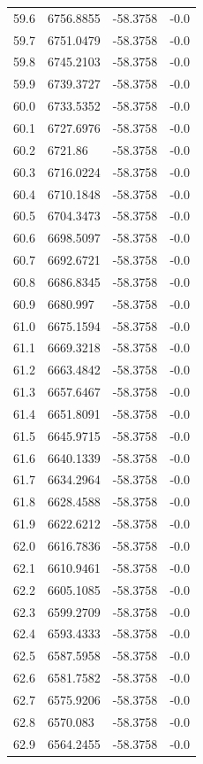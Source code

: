 \begin{table}[H]
\begin{tabular}{llll}
59.6 & 6756.8855 & -58.3758 & -0.0 \\
59.7 & 6751.0479 & -58.3758 & -0.0 \\
59.8 & 6745.2103 & -58.3758 & -0.0 \\
59.9 & 6739.3727 & -58.3758 & -0.0 \\
60.0 & 6733.5352 & -58.3758 & -0.0 \\
60.1 & 6727.6976 & -58.3758 & -0.0 \\
60.2 & 6721.86 & -58.3758 & -0.0 \\
60.3 & 6716.0224 & -58.3758 & -0.0 \\
60.4 & 6710.1848 & -58.3758 & -0.0 \\
60.5 & 6704.3473 & -58.3758 & -0.0 \\
60.6 & 6698.5097 & -58.3758 & -0.0 \\
60.7 & 6692.6721 & -58.3758 & -0.0 \\
60.8 & 6686.8345 & -58.3758 & -0.0 \\
60.9 & 6680.997 & -58.3758 & -0.0 \\
61.0 & 6675.1594 & -58.3758 & -0.0 \\
61.1 & 6669.3218 & -58.3758 & -0.0 \\
61.2 & 6663.4842 & -58.3758 & -0.0 \\
61.3 & 6657.6467 & -58.3758 & -0.0 \\
61.4 & 6651.8091 & -58.3758 & -0.0 \\
61.5 & 6645.9715 & -58.3758 & -0.0 \\
61.6 & 6640.1339 & -58.3758 & -0.0 \\
61.7 & 6634.2964 & -58.3758 & -0.0 \\
61.8 & 6628.4588 & -58.3758 & -0.0 \\
61.9 & 6622.6212 & -58.3758 & -0.0 \\
62.0 & 6616.7836 & -58.3758 & -0.0 \\
62.1 & 6610.9461 & -58.3758 & -0.0 \\
62.2 & 6605.1085 & -58.3758 & -0.0 \\
62.3 & 6599.2709 & -58.3758 & -0.0 \\
62.4 & 6593.4333 & -58.3758 & -0.0 \\
62.5 & 6587.5958 & -58.3758 & -0.0 \\
62.6 & 6581.7582 & -58.3758 & -0.0 \\
62.7 & 6575.9206 & -58.3758 & -0.0 \\
62.8 & 6570.083 & -58.3758 & -0.0 \\
62.9 & 6564.2455 & -58.3758 & -0.0 \\

\end{tabular}
\end{table}
